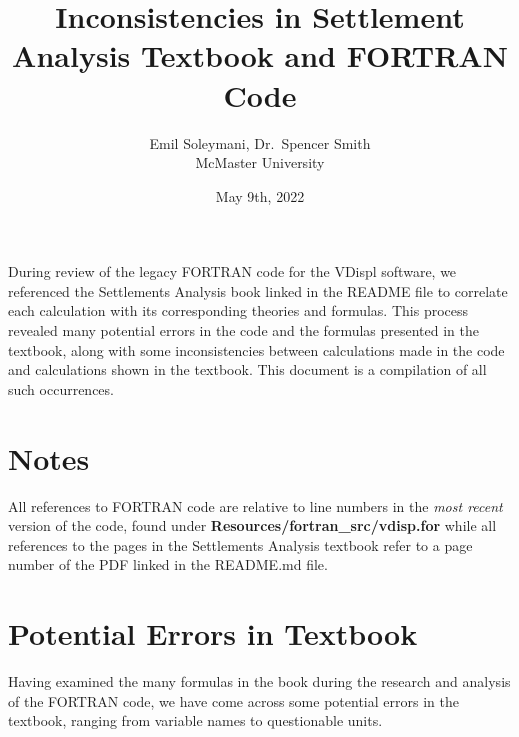 \documentclass[11pt,fleqn]{article}
\newcommand{\indentpar}{\phantom{=}}
\begin{document}
      
      \title{Inconsistencies in Settlement Analysis Textbook and FORTRAN Code}
      \date{May 9th, 2022}
      \author{Emil Soleymani, Dr.~Spencer Smith\\ McMaster University}
      \maketitle

      \medskip

      \indentpar During review of the legacy FORTRAN code for the VDispl software, 
      we referenced the Settlements Analysis book linked in the README 
      file to correlate each calculation with its corresponding 
      theories and formulas. This process revealed many potential errors 
      in the code and the formulas presented in the textbook, along with 
      some inconsistencies between calculations made in the code and 
      calculations shown in the textbook. This document is a compilation 
      of all such occurrences.
      
    
    \pagebreak
    

    \section*{Notes}
    \indentpar All references to FORTRAN code are relative to line numbers 
    in the \emph{most recent} version of the code, found under 
    \textbf{Resources/fortran\_src/vdisp.for} while all references to the pages
    in the Settlements Analysis textbook refer to a page number of the PDF linked 
    in the README.md file.

    
    \medskip

    \section*{Potential Errors in Textbook}
    \indentpar Having examined the many formulas in the book during the research and 
    analysis of the FORTRAN code, we have come across some potential errors in the
    textbook, ranging from variable names to questionable units.
\end{document}
